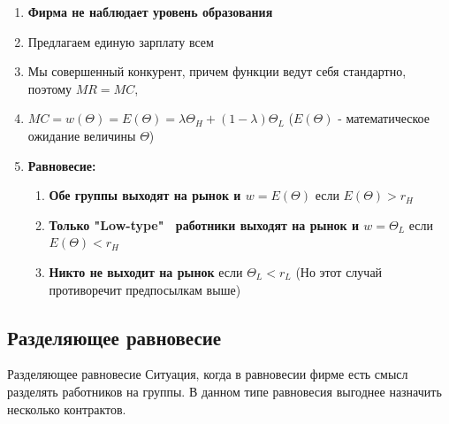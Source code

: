 \begin{enumerate}
    \item \textbf{Фирма не наблюдает уровень образования}
    \item Предлагаем единую зарплату всем
    \item Мы совершенный конкурент, причем функции ведут себя стандартно, поэтому $MR=MC$,
    \item $MC=w(\Theta)=E(\Theta)=\lambda\Theta_H+(1-\lambda)\Theta_L$ ($E(\Theta)$ - математическое ожидание величины $\Theta$)
    \item \textbf{Равновесие:} \begin{enumerate}
        \item \textbf{Обе группы выходят на рынок и $w=E(\Theta)$} если $E(\Theta)>r_H$
        \item \textbf{Только "Low-type" \ работники выходят на рынок и $w=\Theta_L$} если $E(\Theta)<r_H$
        \item \textbf{Никто не выходит на рынок} если $\Theta_L<r_L$ (Но этот случай противоречит предпосылкам выше)
    \end{enumerate}
\end{enumerate}

\subsection{Разделяющее равновесие}

\begin{mybox}{Разделяющее равновесие}
    Ситуация, когда в равновесии фирме есть смысл разделять работников на группы. В данном типе равновесия
    выгоднее назначить несколько контрактов.
\end{mybox}

